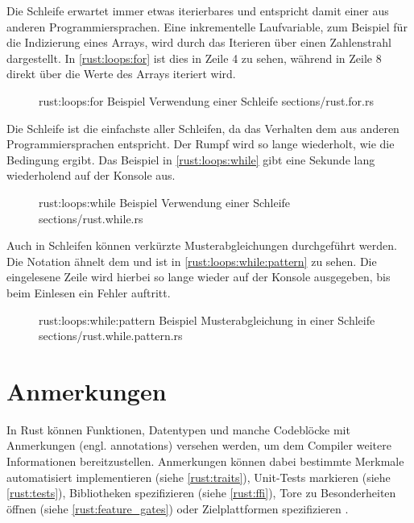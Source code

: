 Die  Schleife erwartet immer etwas iterierbares und entspricht damit einer  aus anderen Programmiersprachen.
Eine inkrementelle Laufvariable, zum Beispiel für die Indizierung eines Arrays, wird durch das Iterieren über einen Zahlenstrahl dargestellt.
In \autoref{rust:loops:for} ist dies in Zeile 4 zu sehen, während in Zeile 8 direkt über die Werte des Arrays iteriert wird.

\begin{figure}[H]
	\rustcinclude
		{rust:loops:for}
		{Beispiel Verwendung einer  Schleife}
		{sections/rust.for.rs}
\end{figure}


Die  Schleife ist die einfachste aller Schleifen, da das Verhalten dem aus anderen Programmiersprachen entspricht.
Der Rumpf wird so lange wiederholt, wie die Bedingung  ergibt.
Das Beispiel in \autoref{rust:loops:while} gibt eine Sekunde lang wiederholend  auf der Konsole aus.


\begin{figure}[H]
	\rustcinclude
		{rust:loops:while}
		{Beispiel Verwendung einer  Schleife}
		{sections/rust.while.rs}
\end{figure}

Auch in  Schleifen können verkürzte Musterabgleichungen durchgeführt werden.
Die Notation ähnelt dem  und ist in \autoref{rust:loops:while:pattern} zu sehen.
Die eingelesene Zeile wird hierbei so lange wieder auf der Konsole ausgegeben, bis beim Einlesen ein Fehler auftritt.

\begin{figure}[H]
	\rustcinclude
		{rust:loops:while:pattern}
		{Beispiel Musterabgleichung in einer  Schleife}
		{sections/rust.while.pattern.rs}
\end{figure}

\section{Anmerkungen}
\label{rust:annotations}

In Rust können Funktionen, Datentypen und manche Codeblöcke mit Anmerkungen (engl. annotations) versehen werden, um dem Compiler weitere Informationen bereitzustellen.
Anmerkungen können dabei bestimmte Merkmale automatisiert implementieren (siehe \autoref{rust:traits}), Unit-Tests markieren (siehe \autoref{rust:tests}), Bibliotheken spezifizieren (siehe \autoref{rust:ffi}),  Tore zu Besonderheiten öffnen (siehe \autoref{rust:feature_gates})  oder  Zielplattformen spezifizieren \cite{rust:book:annotation:cfg}.

